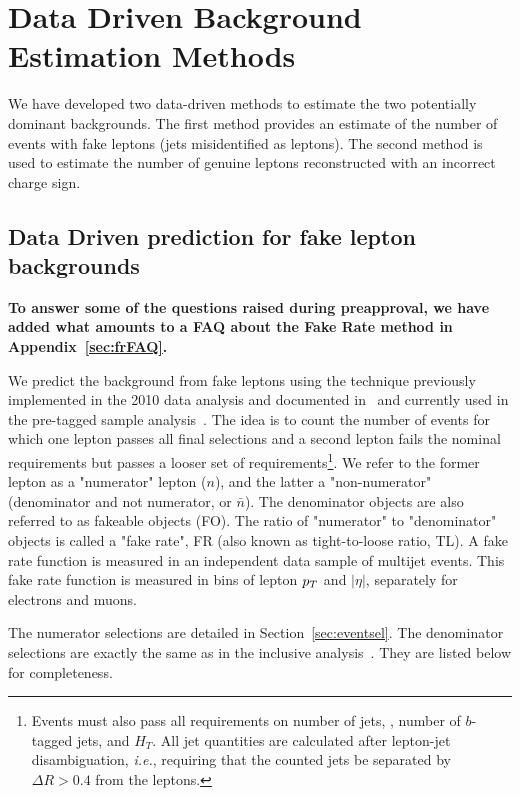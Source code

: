 \section{Data Driven Background Estimation Methods}
\label{sec:datadriven}

We have developed two data-driven methods to 
estimate the two potentially dominant backgrounds.
The first method provides an estimate of the number of events with fake leptons (jets misidentified as leptons).
The second method is used to estimate the number of genuine leptons reconstructed with an incorrect charge sign.

\subsection{Data Driven prediction for fake lepton backgrounds}
\label{sec:fakes}

{\bf To answer some of the questions raised during preapproval,
we have added what amounts to a FAQ about the Fake Rate 
method in Appendix~\ref{sec:frFAQ}.}



We predict the background from fake leptons using the technique previously implemented in the 2010 data analysis
and documented in~\cite{frmethod} and currently used in the pre-tagged sample analysis~\cite{ssnote2011}.
The idea is to count the number of events for which one lepton passes all final selections and a second lepton
fails the nominal requirements but passes a looser set of requirements\footnote{Events must also
pass all requirements on number of jets, \met, number of $b$-tagged jets, and $H_T$.
All jet quantities are calculated after lepton-jet disambiguation, {\it i.e.}, requiring 
that the counted jets be separated by $\Delta R > 0.4$ from the leptons.}. 
We refer to the former lepton as a "numerator" lepton ($n$),
and the latter a "non-numerator" (denominator and not numerator, or $\bar{n}$).
The denominator objects are also referred to as fakeable objects (FO).
The ratio of "numerator" to "denominator" objects is called a "fake rate",
 FR (also known as tight-to-loose ratio, TL).  
A fake rate function is measured in an independent data sample of multijet events.
This fake rate function is measured in bins of lepton $p_T$ and $|\eta |$,
separately for electrons and muons. 

The numerator selections are detailed in Section~\ref{sec:eventsel}. 
The denominator selections are exactly the same as in the inclusive analysis~\cite{ssnote2011}.
They are listed below for completeness.

